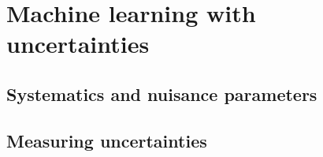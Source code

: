 
\chapter{Machine learning with uncertainties}  %
\label{chap:intro_ml}
\ifpdf
    \graphicspath{{Chapter2/Figs/Raster/}{Chapter2/Figs/PDF/}{Chapter2/Figs/}}
\else
    \graphicspath{{Chapter2/Figs/Vector/}{Chapter2/Figs/}}
\fi

\section{Systematics and nuisance parameters} %
\label{sec:systematics_and_nuisance_parameters}

\section{Measuring uncertainties} %
\label{sec:measuring_uncertainties}

